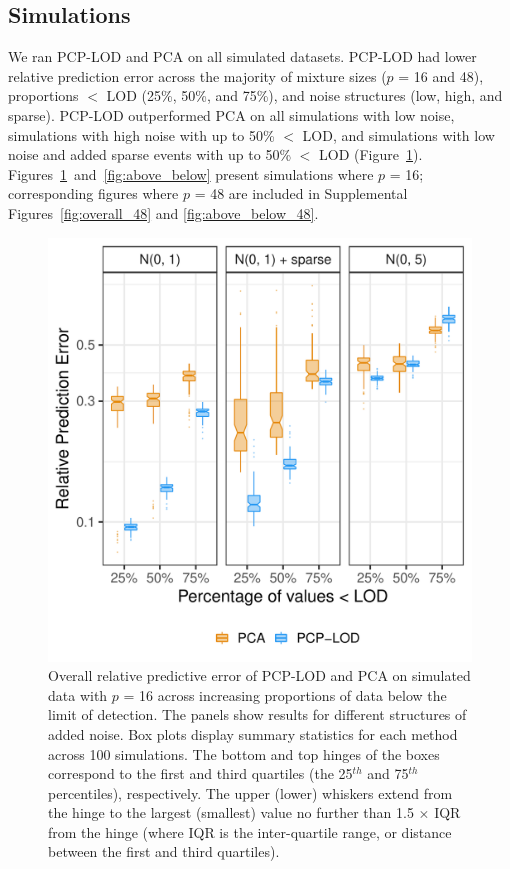 \subsection{Simulations} We ran PCP-LOD and PCA on all simulated datasets. PCP-LOD had lower relative prediction error across the majority of  mixture sizes ($p$ = 16 and 48), proportions $<$ LOD (25\%, 50\%, and 75\%), and noise structures (low, high, and sparse). PCP-LOD outperformed PCA on all simulations with low noise, simulations with high noise with up to 50\% $<$ LOD, and simulations with low noise and added sparse events with up to 50\% $<$ LOD (Figure~\ref{fig:overall}). Figures~\ref{fig:overall}~and~\ref{fig:above_below} present simulations where $p$ = 16; corresponding figures where $p$ = 48 are included in Supplemental Figures~\ref{fig:overall_48} and \ref{fig:above_below_48}.

\begin{figure}
    \centering
\includegraphics[width=.85\textwidth]{figures/sim_boxplots_16.pdf}
   \caption{Overall relative predictive error of PCP-LOD and PCA on simulated data with $p$ = 16 across increasing proportions of data below the limit of detection. The panels show results for different structures of added noise. Box plots display summary statistics for each method across 100 simulations. The bottom and top hinges of the boxes correspond to the first and third quartiles (the 25$^{th}$ and 75$^{th}$ percentiles), respectively. The upper (lower) whiskers extend from the hinge to the largest (smallest) value no further than 1.5 $\times$ IQR from the hinge (where IQR is the inter-quartile range, or distance between the first and third quartiles).}
    \label{fig:overall}
\end{figure}

